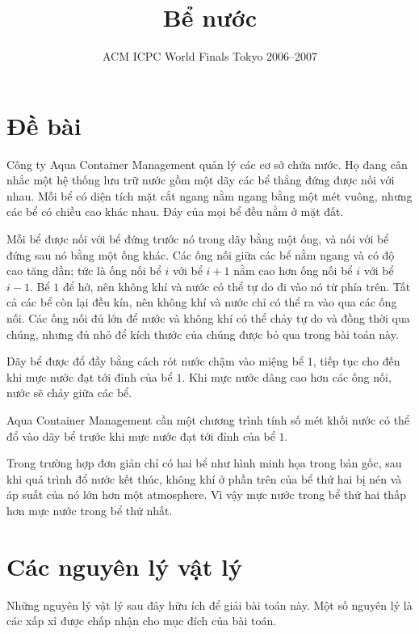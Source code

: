 \documentclass[11pt]{article}
\title{Bể nước}
\author{ACM ICPC World Finals Tokyo 2006--2007}
\date{}
\begin{document}
\maketitle


\section*{Đề bài}

Công ty Aqua Container Management quản lý các cơ sở chứa nước. Họ đang cân
nhắc một hệ thống lưu trữ nước gồm một dãy các bể thẳng đứng được nối với
nhau. Mỗi bể có diện tích mặt cắt ngang nằm ngang bằng một mét vuông, nhưng
các bể có chiều cao khác nhau. Đáy của mọi bể đều nằm ở mặt đất.

Mỗi bể được nối với bể đứng trước nó trong dãy bằng một ống, và nối với bể
đứng sau nó bằng một ống khác. Các ống nối giữa các bể nằm ngang và có độ cao
tăng dần; tức là ống nối bể $i$ với bể $i+1$ nằm cao hơn ống nối bể $i$ với
bể $i-1$. Bể $1$ để hở, nên không khí và nước có thể tự do đi vào nó từ phía
trên. Tất cả các bể còn lại đều kín, nên không khí và nước chỉ có thể ra vào
qua các ống nối. Các ống nối đủ lớn để nước và không khí có thể chảy tự do và
đồng thời qua chúng, nhưng đủ nhỏ để kích thước của chúng được bỏ qua trong
bài toán này.

Dãy bể được đổ đầy bằng cách rót nước chậm vào miệng bể $1$, tiếp tục cho đến
khi mực nước đạt tới đỉnh của bể $1$. Khi mực nước dâng cao hơn các ống nối,
nước sẽ chảy giữa các bể.

Aqua Container Management cần một chương trình tính số mét khối nước có thể
đổ vào dãy bể trước khi mực nước đạt tới đỉnh của bể $1$.

Trong trường hợp đơn giản chỉ có hai bể như hình minh họa trong bản gốc, sau
khi quá trình đổ nước kết thúc, không khí ở phần trên của bể thứ hai bị nén
và áp suất của nó lớn hơn một atmosphere. Vì vậy mực nước trong bể thứ hai thấp
hơn mực nước trong bể thứ nhất.

\section*{Các nguyên lý vật lý}

Những nguyên lý vật lý sau đây hữu ích để giải bài toán này. Một số nguyên lý
là các xấp xỉ được chấp nhận cho mục đích của bài toán.
\end{document}
